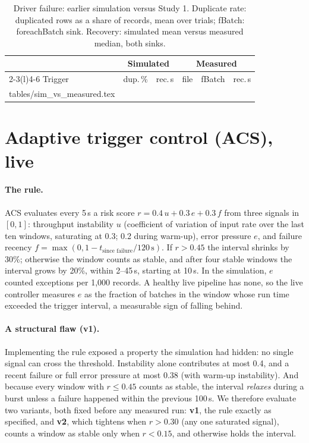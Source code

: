 \documentclass[10pt,twocolumn]{article}
\makeatletter
\def\SimRows{\@@input tables/sim_vs_measured.tex }
\makeatother
\begin{document}
\begin{table}[t]
\centering\small
\caption{Driver failure: earlier simulation versus Study 1. Duplicate rate:
duplicated rows as a share of records, mean over trials; fBatch: foreachBatch sink. Recovery: simulated
mean versus measured median, both sinks.}
\label{tab:sim}
\setlength{\tabcolsep}{3.5pt}
\begin{tabular}{@{}lrrrrr@{}}
\toprule
 & \multicolumn{2}{c}{Simulated} & \multicolumn{3}{c}{Measured} \\
\cmidrule(lr){2-3}\cmidrule(l){4-6}
Trigger & dup.\,\% & rec.\,s & file & fBatch & rec.\,s \\
\midrule
\SimRows
\bottomrule
\end{tabular}
\end{table}

\section{Adaptive trigger control (ACS), live}
\label{sec:acs}

\paragraph{The rule.}
ACS evaluates every 5\,s a risk score
$r = 0.4\,u + 0.3\,e + 0.3\,f$ from three signals in $[0,1]$: throughput
instability $u$ (coefficient of variation of input rate over the last ten
windows, saturating at 0.3; 0.2 during warm-up), error pressure $e$, and failure
recency $f = \max(0, 1 - t_{\text{since failure}}/120\,\text{s})$. If
$r > 0.45$ the interval shrinks by 30\%; otherwise the window counts as stable,
and after four stable windows the interval grows by 20\%, within 2--45\,s,
starting at 10\,s. In the simulation, $e$ counted exceptions per 1{,}000
records. A healthy live pipeline has none, so the live controller measures $e$
as the fraction of batches in the window whose run time exceeded the trigger
interval, a measurable sign of falling behind.

\paragraph{A structural flaw (v1).}
Implementing the rule exposed a property the simulation had hidden: no single
signal can cross the threshold. Instability alone contributes at most 0.4, and a
recent failure or full error pressure at most 0.38 (with warm-up instability).
And because every window with $r \le 0.45$ counts as stable, the interval
\emph{relaxes} during a burst unless a failure happened within the previous
100\,s. We therefore evaluate two variants, both fixed before any measured run:
\textbf{v1}, the rule exactly as specified, and \textbf{v2}, which tightens when
$r > 0.30$ (any one saturated signal), counts a window as stable only when
$r < 0.15$, and otherwise holds the interval.
\end{document}
